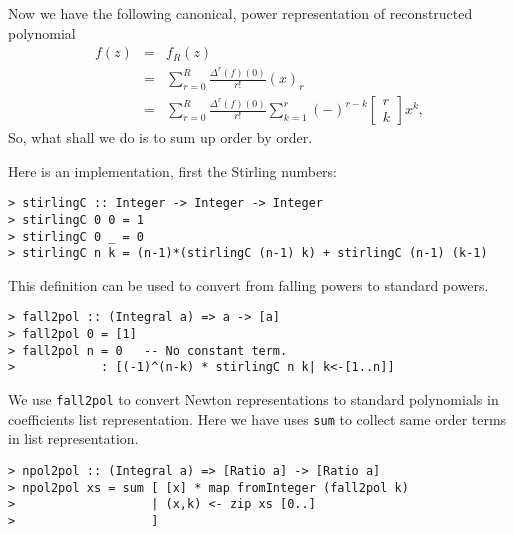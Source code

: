 \documentclass[11pt]{book}
\begin{document}
Now we have the following canonical, power representation of reconstructed polynomial
\begin{eqnarray}
f(z) &=& f_R(z) \\
&=& \sum_{r=0}^R \frac{\Delta^r(f)(0)}{r!} (x)_r \\
&=& \sum_{r=0}^R \frac{\Delta^r(f)(0)}{r!} \sum_{k=1}^r (-)^{r-k} \left[\begin{array}{c}r \\k \end{array}\right] x^k, 
\end{eqnarray}
So, what shall we do is to sum up order by order.

Here is an implementation, first the Stirling numbers:
\begin{verbatim}
> stirlingC :: Integer -> Integer -> Integer
> stirlingC 0 0 = 1
> stirlingC 0 _ = 0
> stirlingC n k = (n-1)*(stirlingC (n-1) k) + stirlingC (n-1) (k-1)
\end{verbatim}
This definition can be used to convert from falling powers to standard powers.
\begin{verbatim}
> fall2pol :: (Integral a) => a -> [a]
> fall2pol 0 = [1]
> fall2pol n = 0   -- No constant term. 
>            : [(-1)^(n-k) * stirlingC n k| k<-[1..n]]
\end{verbatim}
We use \texttt{fall2pol} to convert Newton representations to standard polynomials in coefficients list representation.
Here we have uses \verb+sum+ to collect same order terms in list representation.
\begin{verbatim}
> npol2pol :: (Integral a) => [Ratio a] -> [Ratio a]
> npol2pol xs = sum [ [x] * map fromInteger (fall2pol k)
>                   | (x,k) <- zip xs [0..]
>                   ]
\end{verbatim}
\end{document}
